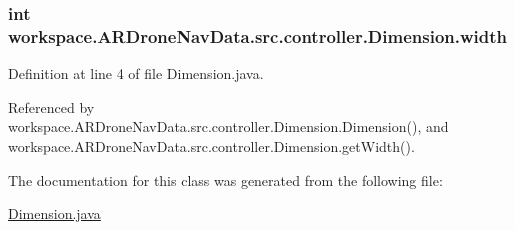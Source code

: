 \subsubsection[{width}]{\setlength{\rightskip}{0pt plus 5cm}int workspace.\+A\+R\+Drone\+Nav\+Data.\+src.\+controller.\+Dimension.\+width\hspace{0.3cm}{\ttfamily [private]}}\label{classworkspace_1_1_a_r_drone_nav_data_1_1src_1_1controller_1_1_dimension_ab9ac1821926d7b93ed9601e81e5fdd79}


Definition at line 4 of file Dimension.\+java.



Referenced by workspace.\+A\+R\+Drone\+Nav\+Data.\+src.\+controller.\+Dimension.\+Dimension(), and workspace.\+A\+R\+Drone\+Nav\+Data.\+src.\+controller.\+Dimension.\+get\+Width().



The documentation for this class was generated from the following file\+:\begin{DoxyCompactItemize}
\item 
\hyperlink{_dimension_8java}{Dimension.\+java}\end{DoxyCompactItemize}

